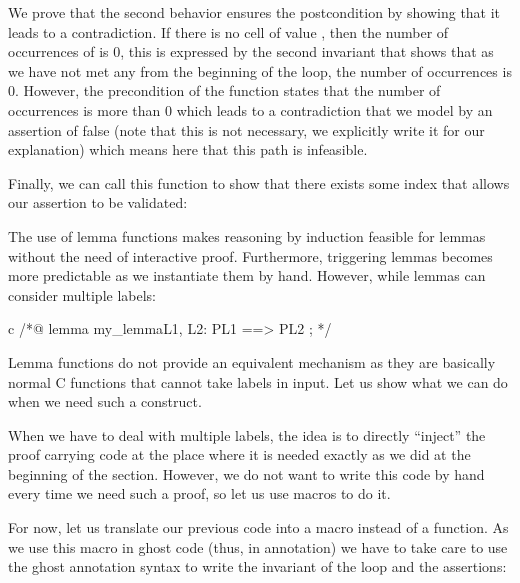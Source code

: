 We prove that the second behavior ensures the postcondition by showing that it
leads to a contradiction. If there is no cell of value , then
the number of occurrences of  is 0, this is expressed by the
second invariant that shows that as we have not met any  from
the beginning of the loop,
the number of occurrences is 0. However, the precondition of the
function states that the number of occurrences is more than $0$ which leads to
a contradiction that we model by an assertion of false (note that this is
not necessary, we explicitly write it for our explanation) which means here that
this path is infeasible.



Finally, we can call this function to show that there exists some index that
allows our assertion to be validated:






The use of lemma functions makes reasoning by induction feasible for lemmas
without the need of interactive proof. Furthermore, triggering lemmas
becomes more predictable as we instantiate them by hand. However, while lemmas
can consider multiple labels:



\begin{CodeBlock}{c}
/*@
  lemma my_lemma{L1, L2}:  P{L1} ==> P{L2} ;
*/
\end{CodeBlock}



Lemma functions do not provide an equivalent mechanism as they are basically
normal C functions that cannot take labels in input. Let us show what we can
do when we need such a construct.






When we have to deal with multiple labels, the idea is to directly ``inject''
the proof carrying code at the place where it is needed exactly as we did at the
beginning of the section. However, we do not want to write this code by hand
every time we need such a proof, so let us use macros to do it.



For now, let us translate our previous code into a macro instead of a function.
As we use this macro in ghost code (thus, in annotation) we have to take care to
use the ghost annotation syntax to write the invariant of the loop and the
assertions:



